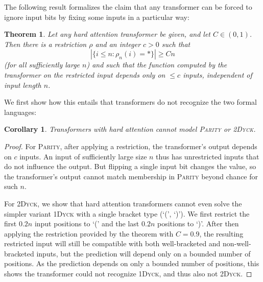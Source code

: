 \documentclass[11pt,a4paper]{article}
\newcounter{theorem}
\newtheorem{corollary}[theorem]{Corollary}
\newtheorem{thm}[theorem]{Theorem}
\begin{document}
The following result formalizes the claim that any transformer can be forced to ignore input bits by fixing some inputs in a particular way:
\begin{thm}\label{thm:hardmax-main}
Let any hard attention transformer be given, and let $C \in (0,1)$.
Then there is a restriction $\rho$ and an integer $c > 0$ such that 
$$|\{i \leq n: \rho_n(i) = *\}| \geq Cn$$
(for all sufficiently large $n$) and such that the function computed by the transformer on the restricted input depends only on $\leq c$ inputs, independent of input length $n$.
\end{thm}
We first show how this entails that transformers do not recognize the two formal languages:
\begin{corollary}
Transformers with hard attention cannot model \textsc{Parity} or \textsc{2Dyck}.
\end{corollary}
\begin{proof}
For \textsc{Parity}, after applying a restriction, the transformer's output depends on $c$ inputs.
An input of sufficiently large size $n$ thus has unrestricted inputs that do not influence the output.
But flipping a single input bit changes the value, so the transformer's output cannot match membership in \textsc{Parity} beyond chance for such $n$.


For \textsc{2Dyck}, we show that hard attention transformers cannot even solve the simpler variant \textsc{1Dyck} with a single bracket type (`(', `)').
We first restrict the first $0.2n$ input positions to `(' and the last $0.2n$ positions to `)'.
After then applying the restriction provided by the theorem with $C=0.9$, the resulting restricted input will still be compatible with both well-bracketed and non-well-bracketed inputs, but the prediction will depend only on a bounded number of positions.
As the prediction depends on only a bounded number of positions, this shows the transformer could not recognize \textsc{1Dyck}, and thus also not \textsc{2Dyck}.
\end{proof}
\end{document}
